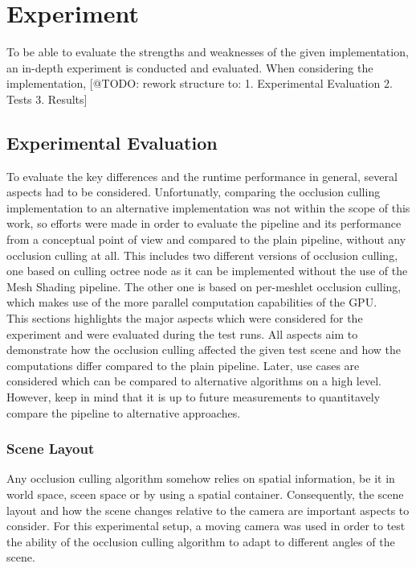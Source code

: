 \chapter{Experiment} \label{cpt-experiment}

To be able to evaluate the strengths and weaknesses of the given implementation, an in-depth 
experiment is conducted and evaluated. When considering the implementation, 
[@TODO: rework structure to: 1. Experimental Evaluation 2. Tests 3. Results]

\section{Experimental Evaluation} \label{sec-experimental-evaluation}

To evaluate the key differences and the runtime performance in general, several aspects had to be considered.
Unfortunatly, comparing the occlusion culling implementation to an alternative implementation was not within the 
scope of this work, so efforts were made in order to evaluate the pipeline and its performance from a conceptual 
point of view and compared to the plain pipeline, without any occlusion culling at all. This includes two different 
versions of occlusion culling, one based on culling octree node as it can be implemented without the use of the 
Mesh Shading pipeline. The other one is based on per-meshlet occlusion culling, which makes use of the more parallel 
computation capabilities of the \ac{GPU}. \\

This sections highlights the major aspects which were considered for the experiment and were evaluated during the 
test runs. All aspects aim to demonstrate how the occlusion culling affected the given test scene and how the 
computations differ compared to the plain pipeline. Later, use cases are considered which can be compared to 
alternative algorithms on a high level. However, keep in mind that it is up to future measurements to quantitavely 
compare the pipeline to alternative approaches. 


\subsection*{Scene Layout}

Any occlusion culling algorithm somehow relies on spatial information, be it in world space, sceen space or by 
using a spatial container. Consequently, the scene layout and how the scene changes relative to the camera are 
important aspects to consider. For this experimental setup, a moving camera was used in order to test the ability 
of the occlusion culling algorithm to adapt to different angles of the scene. \\

